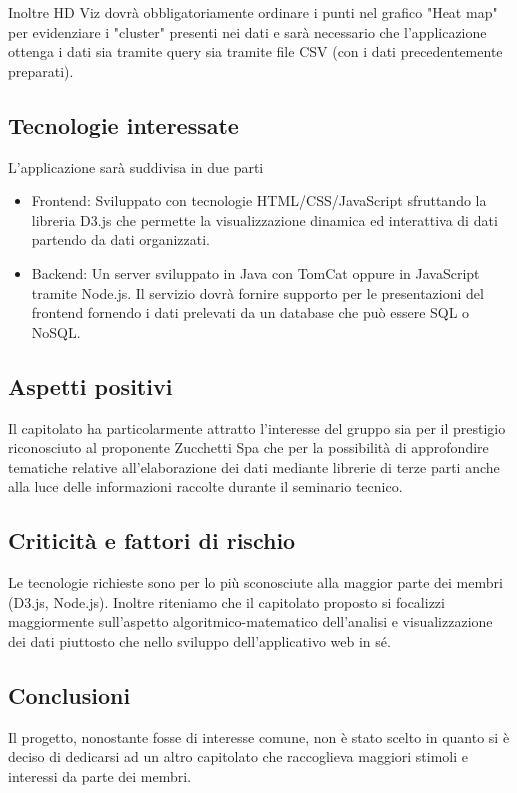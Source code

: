 Inoltre HD Viz dovrà obbligatoriamente ordinare i punti nel grafico "Heat map" per evidenziare i "cluster" presenti nei dati e sarà necessario che l'applicazione ottenga i dati sia tramite query sia tramite file CSV (con i dati precedentemente preparati). 


\subsection{Tecnologie interessate}
L'applicazione sarà suddivisa in due parti
\begin{itemize}
    \item Frontend: Sviluppato con tecnologie HTML/CSS/JavaScript sfruttando la libreria D3.js che permette la visualizzazione dinamica ed interattiva di dati partendo da dati organizzati.
    \item Backend: Un server sviluppato in Java con TomCat oppure in JavaScript tramite Node.js. Il servizio dovrà fornire supporto per le presentazioni del frontend fornendo i dati prelevati da un database che può essere SQL o NoSQL.
\end{itemize}

\subsection{Aspetti positivi}
Il capitolato ha particolarmente attratto l'interesse del gruppo sia per il prestigio riconosciuto al proponente Zucchetti Spa che per la possibilità di approfondire tematiche relative all'elaborazione dei dati mediante librerie di terze parti anche alla luce delle informazioni raccolte durante il seminario tecnico.

\subsection{Criticità e fattori di rischio}
Le tecnologie richieste sono per lo più sconosciute alla maggior parte dei membri (D3.js, Node.js). Inoltre riteniamo che il capitolato proposto si focalizzi maggiormente sull'aspetto algoritmico-matematico dell'analisi e visualizzazione dei dati piuttosto che nello sviluppo dell'applicativo web in sé. 

\subsection{Conclusioni}
Il progetto, nonostante fosse di interesse comune, non è stato scelto in quanto si è deciso di dedicarsi ad un altro capitolato che raccoglieva maggiori stimoli e interessi da parte dei membri.
